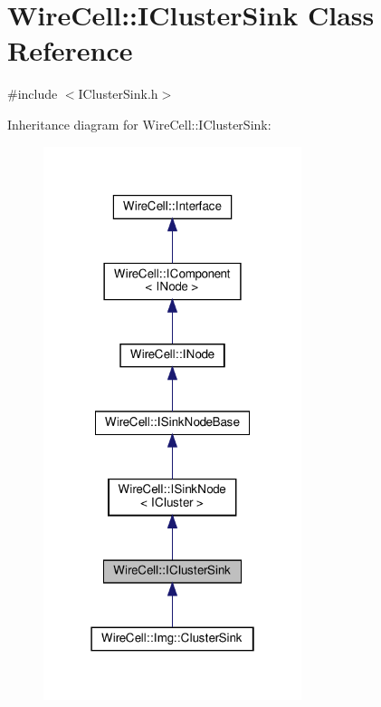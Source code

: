 \hypertarget{class_wire_cell_1_1_i_cluster_sink}{}\section{Wire\+Cell\+:\+:I\+Cluster\+Sink Class Reference}
\label{class_wire_cell_1_1_i_cluster_sink}


{\ttfamily \#include $<$I\+Cluster\+Sink.\+h$>$}



Inheritance diagram for Wire\+Cell\+:\+:I\+Cluster\+Sink\+:
\nopagebreak
\begin{figure}[H]
\begin{center}
\leavevmode
\includegraphics[width=214pt]{class_wire_cell_1_1_i_cluster_sink__inherit__graph}
\end{center}
\end{figure}


